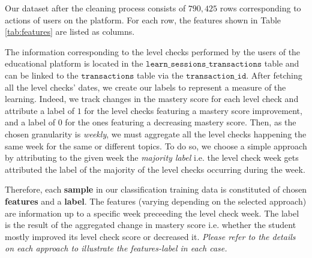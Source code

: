\documentclass[sigplan,screen]{acmart}
\begin{document}
Our dataset after the cleaning process consists of $790,425$ rows corresponding to actions of users on the platform. For each row, the features shown in Table \ref{tab:features} are listed as columns.

The information corresponding to the level checks performed by the users of the educational platform is located in the $\texttt{learn\_sessions\_transactions}$ table and can be linked to the $\texttt{transactions}$ table via the $\texttt{transaction\_id}$. After fetching all the level checks' dates, we create our labels to represent a measure of the learning. Indeed, we track changes in the mastery score for each level check and attribute a label of $1$ for the level checks featuring a mastery score improvement, and a label of $0$ for the ones featuring a decreasing mastery score. Then, as the chosen granularity is \textit{weekly}, we must aggregate all the level checks happening the same week for the same or different topics. To do so, we choose a simple approach by attributing to the given week the \textit{majority label} i.e. the level check week gets attributed the label of the majority of the level checks occurring during the week.

Therefore, each \textbf{sample} in our classification training data is constituted of chosen \textbf{features} and a \textbf{label}. The features (varying depending on the selected approach) are information up to a specific week preceeding the level check week. The label is the result of the aggregated change in mastery score i.e. whether the student mostly improved its level check score or decreased it. \textit{Please refer to the details on each approach to illustrate the features-label in each case.}
\end{document}

